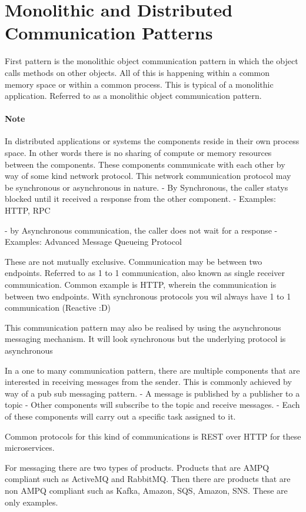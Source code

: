 \section{Monolithic and Distributed Communication Patterns}
First pattern is the monolithic object communication pattern in which the object calls methods on other objects.
All of this is happening within a common memory space or within a common process.
This is typical of a monolithic application.
Referred to as a monolithic object communication pattern.

\paragraph{Note}
In distributed applications or systems the components reside in their own process space.
In other words there is no sharing of compute or memory resources between the components.
These components communicate with each other by way of some kind network protocol.
This network communication protocol may be synchronous or asynchronous in nature.
- By Synchronous, the caller statys blocked until it received a response from the other component.
- Examples: HTTP, RPC

- by Asynchronous communication, the caller does not wait for a response
- Examples: Advanced Message Queueing Protocol

These are not mutually exclusive.
Communication may be between two endpoints.
Referred to as 1 to 1 communication, also known as single receiver communication.
Common example is HTTP, wherein the communication is between two endpoints.
With synchronous protocols you wil always have 1 to 1 communication (Reactive :D)

This communication pattern may also be realised by using the asynchronous messaging mechanism.
It will look synchronous but the underlying protocol is asynchronous

In a one to many communication pattern, there are multiple components that are interested in receiving messages from the sender.
This is commonly achieved by way of a pub sub messaging pattern.
- A message is published by a publisher to a topic
- Other components will subscribe to the topic and receive messages.
- Each of these components will carry out a specific task assigned to it.

Common protocols for this kind of communications is REST over HTTP for these microservices.

For messaging there are two types of products. Products that are AMPQ compliant such as ActiveMQ and RabbitMQ.
Then there are products that are non AMPQ compliant such as Kafka, Amazon, SQS, Amazon, SNS. These are only examples.

